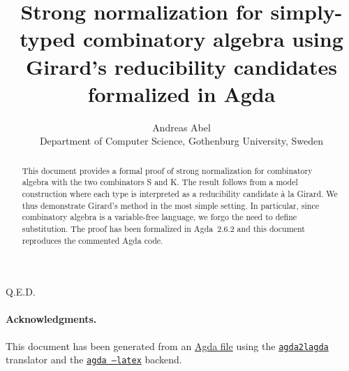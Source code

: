 \documentclass[a4paper]{scrartcl}
\title{Strong normalization for simply-typed combinatory algebra
using Girard's reducibility candidates formalized in Agda}
\author{Andreas Abel
  \\ Department of Computer Science,
    Gothenburg University,
    Sweden
  }
\begin{document}
\maketitle

\begin{abstract}
  This document provides a formal proof of strong normalization for
  combinatory algebra with the two combinators S and K.  The result
  follows from a model construction where each type is interpreted as a
  reducibility candidate à la Girard.  We thus demonstrate Girard's
  method in the most simple setting.  In particular, since combinatory
  algebra is a variable-free language, we forgo the need to define
  substitution.  The proof has been formalized in Agda~2.6.2 and this
  document reproduces the commented Agda code.
\end{abstract}



Q.E.D.

\paragraph*{Acknowledgments.}
This document has been generated from an
\href{https://github.com/andreasabel/truthtable/blob/master/agda/SK-no-bot.agda
    }{Agda file}
using the
\href{https://andreasabel.github.io/agda2lagda/}{\texttt{agda2lagda}}
translator and the \href{http://agda-lang.org}{\texttt{agda --latex}} backend.



% 





% 

\end{document}
